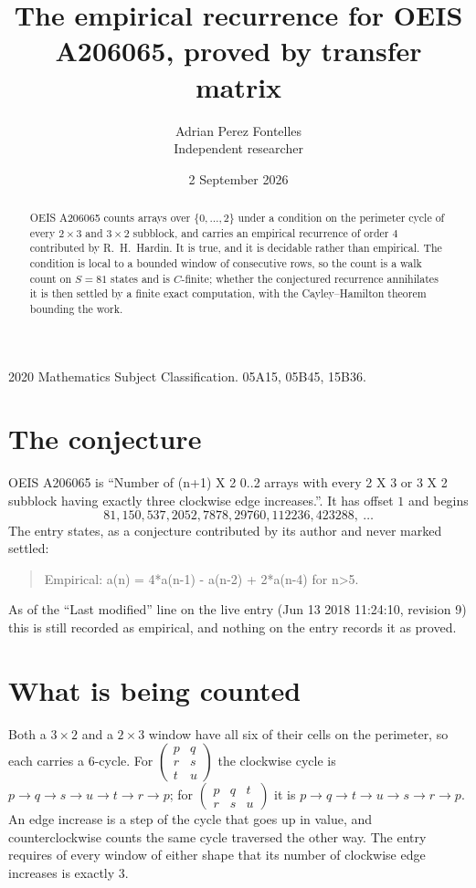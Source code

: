 \documentclass[11pt,a4paper]{article}
\title{The empirical recurrence for OEIS A206065, proved by transfer matrix}
\author{Adrian Perez Fontelles\\ \small Independent researcher}
\date{2 September 2026}
\theoremstyle{plain}
\theoremstyle{definition}
\begin{document}
\maketitle

\begin{abstract}
OEIS A206065 counts arrays over $\{0,\dots,2\}$ under a condition on the perimeter cycle of
every $2\times3$ and $3\times2$ subblock, and carries an empirical recurrence of order $4$ contributed by
R.~H.~Hardin. It is true, and it is decidable rather than empirical. The condition is local to
a bounded window of consecutive rows, so the count is a walk count on $S=81$ states and is
$C$-finite; whether the conjectured recurrence annihilates it is then settled by a finite exact
computation, with the Cayley--Hamilton theorem bounding the work.
\end{abstract}

\noindent\small 2020 Mathematics Subject Classification. 05A15, 05B45, 15B36.\normalsize

\section{The conjecture}

OEIS A206065 is ``Number of (n+1) X 2 0..2 arrays with every 2 X 3 or 3 X 2 subblock having exactly three clockwise edge increases.''. It has offset $1$ and begins
\[
81, 150, 537, 2052, 7878, 29760, 112236, 423288,\ \dots
\]
The entry states, as a conjecture contributed by its author and never marked settled:
\begin{quote}
Empirical: a(n) = 4*a(n-1) - a(n-2) + 2*a(n-4) for n>5.
\end{quote}
As of the ``Last modified'' line on the live entry (Jun 13 2018 11:24:10, revision 9) this is still
recorded as empirical, and nothing on the entry records it as proved.

\section{What is being counted}

Both a $3\times2$ and a $2\times3$ window have all six of their cells on the
perimeter, so each carries a $6$-cycle. For
$\begin{pmatrix}p&q\\r&s\\t&u\end{pmatrix}$ the clockwise cycle is
$p\to q\to s\to u\to t\to r\to p$; for
$\begin{pmatrix}p&q&t\\r&s&u\end{pmatrix}$ it is
$p\to q\to t\to u\to s\to r\to p$. An edge increase is a step of the cycle that goes up in
value, and counterclockwise counts the same cycle traversed the other way. The entry requires
of every window of either shape that its number of clockwise edge increases is exactly $3$.
\end{document}
